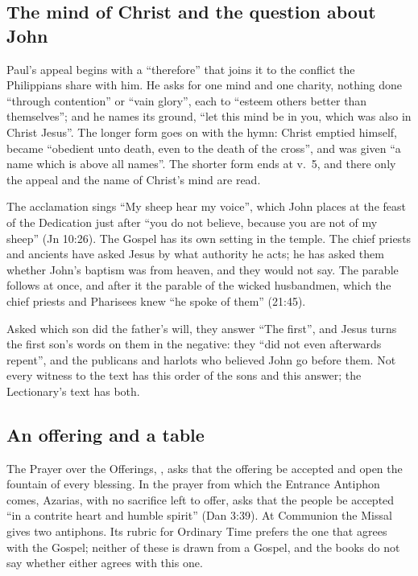 \subsection{The mind of Christ and the question about John}

Paul's appeal begins with a ``therefore'' that joins it to the conflict the
Philippians share with him. He asks for one mind and one charity, nothing done
``through contention'' or ``vain glory'', each to ``esteem others better than
themselves''; and he names its ground, ``let this mind be in you, which was
also in Christ Jesus''. The longer form goes on with the hymn: Christ emptied
himself, became ``obedient unto death, even to the death of the cross'', and
was given ``a name which is above all names''. The shorter form ends at v.~5,
and there only the appeal and the name of Christ's mind are read.

The acclamation sings ``My sheep hear my voice'', which John places at the
feast of the Dedication just after ``you do not believe, because you are not of
my sheep'' (Jn 10:26). The Gospel has its own setting in the temple. The chief
priests and ancients have asked Jesus by what authority he acts; he has asked
them whether John's baptism was from heaven, and they would not say. The
parable follows at once, and after it the parable of the wicked husbandmen,
which the chief priests and Pharisees knew ``he spoke of them'' (21:45).

Asked which son did the father's will, they answer ``The first'', and Jesus
turns the first son's words on them in the negative: they ``did not even
afterwards repent'', and the publicans and harlots who believed John go before
them. Not every witness to the text has this order of the sons and this answer; the
Lectionary's text has both.

\subsection{An offering and a table}

The Prayer over the Offerings, , asks
that the offering be accepted and open the fountain of every blessing. In the
prayer from which the Entrance Antiphon comes, Azarias, with no sacrifice left
to offer, asks that the people be accepted ``in a contrite heart and humble
spirit'' (Dan 3:39). At Communion the Missal gives two antiphons. Its rubric
for Ordinary Time prefers the one that agrees with the Gospel; neither of these
is drawn from a Gospel, and the books do not say whether either agrees with
this one.


